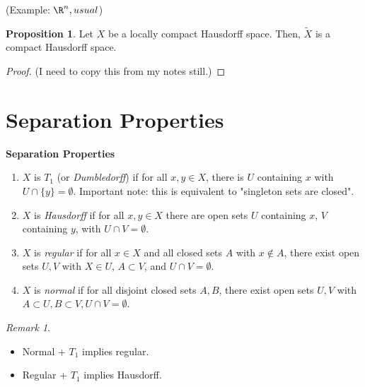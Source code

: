 \documentclass[a5paper]{article}
\theoremstyle{definition}%
\newtheorem{proposition}[theorem]{Proposition}
\numberwithin{exercise}{section}
\theoremstyle{remark}%
\newtheorem*{remark*}{Remark}
\begin{document}
(Example: $\R^n, usual$)

\begin{proposition}
Let $X$ be a locally compact Hausdorff space. Then, $\widetilde{X}$ is a compact Hausdorff space. 
\end{proposition}
\begin{proof}
(I need to copy this from my notes still.)
\end{proof}

\section{Separation Properties}

\begin{highlight}
\textbf{Separation Properties}
\begin{enumerate}
\item $X$ is $T_1$ (or \emph{Dumbledorff}) if for all $x,y\in X$, there is $U$ containing $x$ with $U\cap \{y\}=\emptyset$. Important note: this is equivalent to "singleton sets are closed". 
\item $X$ is \emph{Hausdorff} if for all $x,y\in X$ there are open sets $U$ containing $x$, $V$ containing $y$, with $U\cap V=\emptyset$. 
\item $X$ is \emph{regular} if for all $x\in X$ and all closed sets $A$ with $x\not\in A$, there exist open sets $U,V$ with $X\in U$, $A\subset V$, and $U\cap V=\emptyset$. 
\item $X$ is \emph{normal} if for all disjoint closed sets $A,B$, there exist open sets $U,V$ with $A\subset U, B\subset V, U\cap V=\emptyset$. 
\end{enumerate}
\end{highlight}

\begin{remark*}\mbox{}
\begin{itemize}
\item Normal + $T_1$ implies regular.
\item Regular + $T_1$ implies Hausdorff.
\end{itemize}
\end{remark*}
\end{document}
